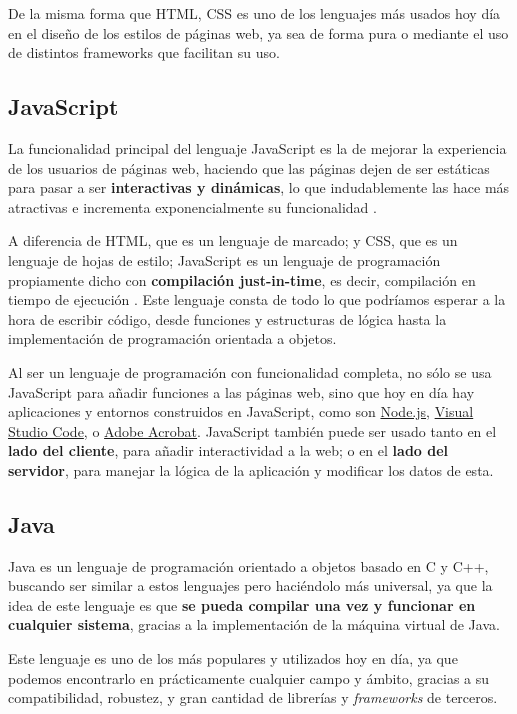 De la misma forma que HTML, CSS es uno de los lenguajes más usados hoy día en el diseño de los estilos de páginas web, ya sea de forma pura o mediante el uso de distintos frameworks que facilitan su uso.

\subsection{JavaScript}

La funcionalidad principal del lenguaje JavaScript es la de mejorar la experiencia de los usuarios de páginas web, haciendo que las páginas dejen de ser estáticas para pasar a ser \textbf{interactivas y dinámicas}, lo que indudablemente las hace más atractivas e incrementa exponencialmente su funcionalidad \cite{aws:javascript}.

A diferencia de HTML, que es un lenguaje de marcado; y CSS, que es un lenguaje de hojas de estilo; JavaScript es un lenguaje de programación propiamente dicho con \textbf{compilación just-in-time}, es decir, compilación en tiempo de ejecución \cite{mdn:javascript}. Este lenguaje consta de todo lo que podríamos esperar a la hora de escribir código, desde funciones y estructuras de lógica hasta la implementación de programación orientada a objetos.

Al ser un lenguaje de programación con funcionalidad completa, no sólo se usa JavaScript para añadir funciones a las páginas web, sino que hoy en día hay aplicaciones y entornos construidos en JavaScript, como son \href{https://nodejs.org/en}{Node.js}, \href{https://code.visualstudio.com/}{Visual Studio Code}, o \href{https://www.adobe.com/es/acrobat.html}{Adobe Acrobat}. JavaScript también puede ser usado tanto en el \textbf{lado del cliente}, para añadir interactividad a la web; o en el \textbf{lado del servidor}, para manejar la lógica de la aplicación y modificar los datos de esta.

\subsection{Java}

Java es un lenguaje de programación orientado a objetos basado en C y C++, buscando ser similar a estos lenguajes pero haciéndolo más universal, ya que la idea de este lenguaje es que \textbf{se pueda compilar una vez y funcionar en cualquier sistema}, gracias a la implementación de la máquina virtual de Java.

 Este lenguaje es uno de los más populares y utilizados hoy en día, ya que podemos encontrarlo en prácticamente cualquier campo y ámbito, gracias a su compatibilidad, robustez, y gran cantidad de librerías y \textit{frameworks} de terceros. \cite{aws:java}
 
